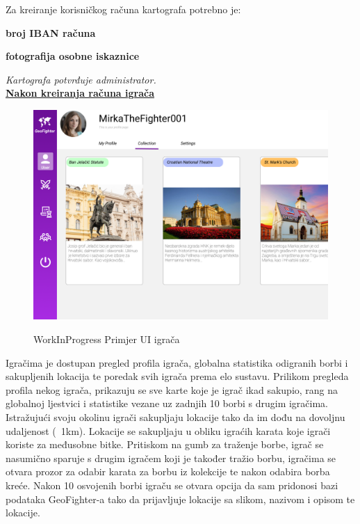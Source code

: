 		\noindent\textnormal{Za kreiranje korisničkog računa kartografa potrebno je:}
		\begin{packed_item}
			\item \textbf{broj IBAN računa}
			\item \textbf{fotografija osobne iskaznice}
		\end{packed_item}
		\textit{Kartografa potvrđuje administrator.}\\
		
		\noindent\textbf{\underline{Nakon kreiranja računa igrača}}
		\begin{figure}[H]
			\centering
			\includegraphics[scale=0.2]{slike/example} \\%
			\caption{WorkInProgress Primjer UI igrača}
			\label{fig:example} %
		\end{figure}
		
		
		\textnormal{Igračima je dostupan pregled profila igrača, globalna statistika odigranih borbi i sakupljenih lokacija te poredak svih igrača prema elo sustavu. Prilikom pregleda profila nekog igrača, prikazuju se sve karte koje je igrač ikad sakupio, rang na globalnoj ljestvici i statistike vezane uz zadnjih 10 borbi s drugim igračima. Istražujući svoju okolinu igrači sakupljaju lokacije tako da im dođu na dovoljnu udaljenost (~1km). Lokacije se sakupljaju u obliku igraćih karata koje igrači koriste za međusobne bitke. Pritiskom na gumb za traženje borbe, igrač se nasumično sparuje s drugim igračem koji je također tražio borbu, igračima se otvara prozor za odabir karata za borbu iz kolekcije te nakon odabira borba kreće. Nakon 10 osvojenih borbi igraču se otvara opcija da sam pridonosi bazi podataka GeoFighter-a tako da prijavljuje lokacije sa slikom, nazivom i opisom te lokacije.}\\
		
